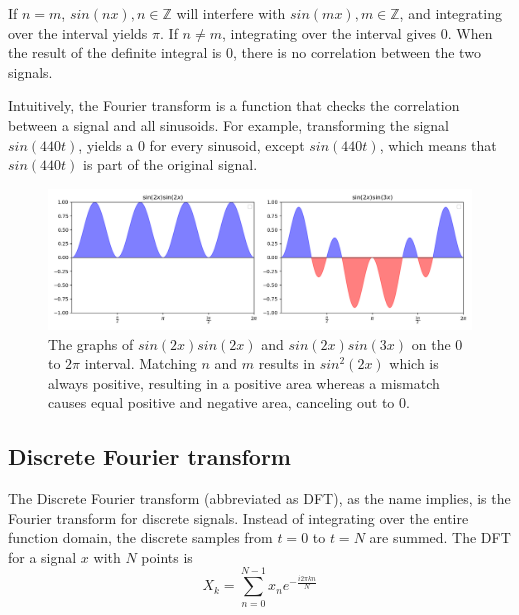 If $n = m $, $sin(nx), n\in\mathbb{Z}$ will interfere with $sin(mx), m\in\mathbb{Z}$, and integrating over the interval yields $\pi$. If $n \neq m$, integrating over the interval gives 0. When the result of the definite integral is 0, there is no correlation between the two signals. 

Intuitively, the Fourier transform is a function that checks the correlation between a signal and all sinusoids. For example, transforming the signal $sin(440t)$, yields a 0 for every sinusoid, except $sin(440t)$, which means that $sin(440t)$ is part of the original signal.

\begin{figure}[ht]
    \centering
    \includegraphics[width=\textwidth]{./images/transformIdea.png}
    \caption{The graphs of $sin(2x)sin(2x)$ and $sin(2x)sin(3x)$ on the $0$ to $2\pi$ interval. Matching $n$ and $m$ results in $sin^2(2x)$ which is always positive, resulting in a positive area whereas a mismatch causes equal positive and negative area, canceling out to 0.\label{fig:transformIdea}}
\end{figure}

\subsection{Discrete Fourier transform} 
The Discrete Fourier transform (abbreviated as DFT), as the name implies, is the Fourier transform for discrete signals. Instead of integrating over the entire function domain, the discrete samples from $t=0$ to $t=N$ are summed. The DFT for a signal $x$ with $N$ points is 
$$X_k = \sum_{n=0}^{N-1} x_ne^{-\frac{i2\pi kn}{N}}$$

